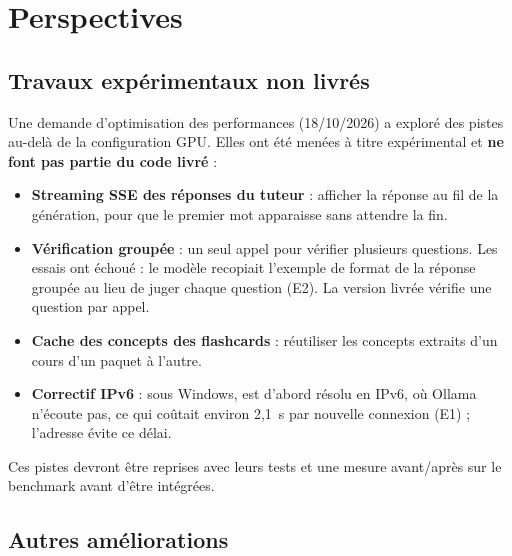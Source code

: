 \documentclass[12pt,a4paper]{report}
\DeclareRobustCommand{\code}[1]{\texttt{\codecasse{#1}}}
\begin{document}
\section{Perspectives}
\label{sec:perspectives}

\subsection{Travaux expérimentaux non livrés}

Une demande d'optimisation des performances (18/10/2026) a exploré des pistes au-delà de la configuration
GPU. Elles ont été menées à titre expérimental et \textbf{ne font pas partie du code livré} :
\begin{itemize}
  \item \textbf{Streaming SSE des réponses du tuteur} : afficher la réponse au fil de la génération, pour
        que le premier mot apparaisse sans attendre la fin.
  \item \textbf{Vérification groupée} : un seul appel pour vérifier plusieurs questions. Les essais ont
        échoué : le modèle recopiait l'exemple de format de la réponse groupée au lieu de juger chaque
        question (E2). La version livrée vérifie une question par appel.
  \item \textbf{Cache des concepts des flashcards} : réutiliser les concepts extraits d'un cours d'un
        paquet à l'autre.
  \item \textbf{Correctif IPv6} : sous Windows, \code{localhost} est d'abord résolu en IPv6, où Ollama
        n'écoute pas, ce qui coûtait environ 2,1~s par nouvelle connexion (E1) ; l'adresse
        \code{127.0.0.1} évite ce délai.
\end{itemize}
Ces pistes devront être reprises avec leurs tests et une mesure avant/après sur le benchmark avant d'être
intégrées.

\subsection{Autres améliorations}
\end{document}
